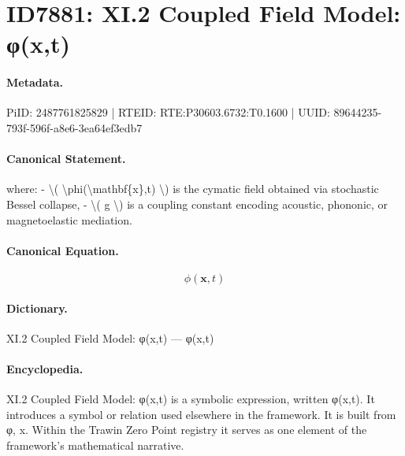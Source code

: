 \section*{ID7881: XI.2 Coupled Field Model: φ(x,t)}
\paragraph{Metadata.}
PiID: 2487761825829 | RTEID: RTE:P30603.6732:T0.1600 | UUID: 89644235-793f-596f-a8e6-3ea64ef3edb7

\paragraph{Canonical Statement.}
where: - \textbackslash{}( \textbackslash{}phi(\textbackslash{}mathbf\{x\},t) \textbackslash{}) is the cymatic field obtained via stochastic Bessel collapse, - \textbackslash{}( g \textbackslash{}) is a coupling constant encoding acoustic, phononic, or magnetoelastic mediation.

\paragraph{Canonical Equation.}
\[
\phi(\mathbf{x},t)
\]

\paragraph{Dictionary.}
XI.2 Coupled Field Model: φ(x,t) — φ(x,t)

\paragraph{Encyclopedia.}
XI.2 Coupled Field Model: φ(x,t) is a symbolic expression, written φ(x,t). It introduces a symbol or relation used elsewhere in the framework. It is built from φ, x. Within the Trawin Zero Point registry it serves as one element of the framework's mathematical narrative.
